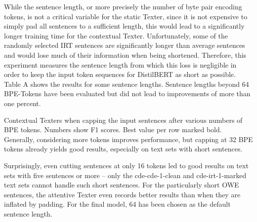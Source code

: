 While the sentence length, or more precisely the number of byte pair encoding tokens, is not a critical variable for the static Texter, since it is not expensive to simply pad all sentences to a sufficient length, this would lead to a significantly longer training time for the contextual Texter. Unfortunately, some of the randomly selected IRT sentences are significantly longer than average sentences and would lose much of their information when being shortened. Therefore, this experiment measures the sentence length from which this loss is negligible in order to keep the input token sequences for DistilBERT as short as possible. Table A shows the results for some sentence lengths. Sentence lengths beyond 64 BPE-Tokens have been evaluated but did not lead to improvements of more than one percent.

\begin{table}[t]
    \makebox[\textwidth][c]{
        
    }
    \caption{Contextual Texters when capping the input sentences after various numbers of BPE tokens. Numbers show F1 scores. Best value per row marked bold. Generally, considering more tokens improves performance, but capping at 32 BPE tokens already yields good results, especially on text sets with short sentences.}
    \label{tab:5_experiments/3_texter/3_context/1_sent_len/grid_search}
\end{table}

Surprisingly, even cutting sentences at only 16 tokens led to good results on text sets with five sentences or more -- only the cde-cde-1-clean and cde-irt-1-marked text sets cannot handle such short sentences. For the particularly short OWE sentences, the attentive Texter even records better results than when they are inflated by padding. For the final model, 64 has been chosen as the default sentence length.
